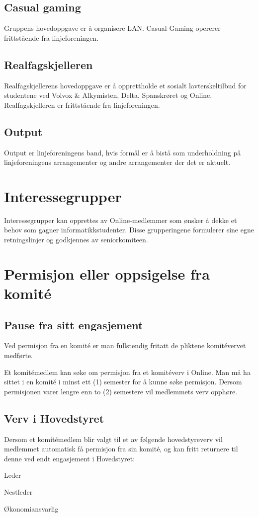 \subsection{Casual gaming}{
Gruppens hovedoppgave er å organisere LAN. Casual Gaming opererer frittstående fra linjeforeningen.
}

\subsection{Realfagskjelleren}{
Realfagskjellerens hovedoppgave er å opprettholde et sosialt lavterskeltilbud for studentene ved Volvox \& Alkymisten, Delta, Spanskrøret og Online. Realfagskjelleren er frittstående fra linjeforeningen.
}

\subsection{Output}{
Output er linjeforeningens band, hvis formål er å bistå som underholdning på linjeforeningens arrangementer og andre arrangementer der det er aktuelt.
}

\section{Interessegrupper}
\vspace{23pt}
Interessegrupper kan opprettes av Online-medlemmer som ønsker å dekke et behov som gagner informatikkstudenter. Disse grupperingene formulerer sine egne retningslinjer og godkjennes av seniorkomiteen.

\section{Permisjon eller oppsigelse fra komité}
\vspace{23pt}

\subsection{Pause fra sitt engasjement}{
Ved permisjon fra en komité er man fullstendig fritatt de pliktene komitévervet medførte.

Et komitémedlem kan søke om permisjon fra et komitéverv i Online. Man må ha sittet i en komité i minst ett (1) semester for å kunne søke permisjon. Dersom permisjonen varer lengre enn to (2) semestere vil medlemmets verv opphøre.
}

\subsection{Verv i Hovedstyret}{
Dersom et komitémedlem blir valgt til et av følgende hovedstyreverv vil medlemmet automatisk få permisjon fra sin komité, og kan fritt \linebreak returnere til denne ved endt engasjement i Hovedstyret:
\begin{liste}
	\item Leder
	\item Nestleder
	\item Økonomiansvarlig
\end{liste}
}

